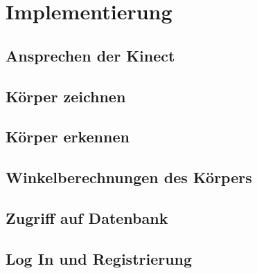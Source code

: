 


\chapter{Implementierung}


\section{Ansprechen der Kinect}

\section{Körper zeichnen}

\section{Körper erkennen}

\section{Winkelberechnungen des Körpers}

\section{Zugriff auf Datenbank}

\section{Log In und Registrierung}

